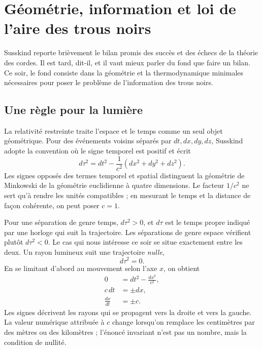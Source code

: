 \chapter{Géométrie, information et loi de l’aire des trous noirs}


Susskind reporte brièvement le bilan promis des succès et des échecs de la théorie des cordes. Il est tard, dit-il, et il vaut mieux parler du fond que faire un bilan. Ce soir, le fond consiste dans la géométrie et la thermodynamique minimales nécessaires pour poser le problème de l’information des trous noirs.

\section{Une règle pour la lumière}

La relativité restreinte traite l’espace et le temps comme un seul objet géométrique. Pour des événements voisins séparés par \(dt,dx,dy,dz\), Susskind adopte la convention où le signe temporel est positif et écrit
\begin{equation}
d\tau^2=dt^2-\frac{1}{c^2}\left(dx^2+dy^2+dz^2\right).
\end{equation}
Les signes opposés des termes temporel et spatial distinguent la géométrie de Minkowski de la géométrie euclidienne à quatre dimensions. Le facteur \(1/c^2\) ne sert qu’à rendre les unités compatibles ; en mesurant le temps et la distance de façon cohérente, on peut poser \(c=1\).

Pour une séparation de genre temps, \(d\tau^2>0\), et \(d\tau\) est le temps propre indiqué par une horloge qui suit la trajectoire. Les séparations de genre espace vérifient plutôt \(d\tau^2<0\). Le cas qui nous intéresse ce soir se situe exactement entre les deux. Un rayon lumineux suit une trajectoire \emph{nulle},
\begin{equation}
d\tau^2=0.
\end{equation}
En se limitant d’abord au mouvement selon l’axe \(x\), on obtient
\begin{align}
0&=dt^2-\frac{dx^2}{c^2},\\
c\,dt&=\pm dx,\\
\frac{dx}{dt}&=\pm c.
\end{align}
Les signes décrivent les rayons qui se propagent vers la droite et vers la gauche. La valeur numérique attribuée à \(c\) change lorsqu’on remplace les centimètres par des mètres ou des kilomètres ; l’énoncé invariant n’est pas un nombre, mais la condition de nullité.

